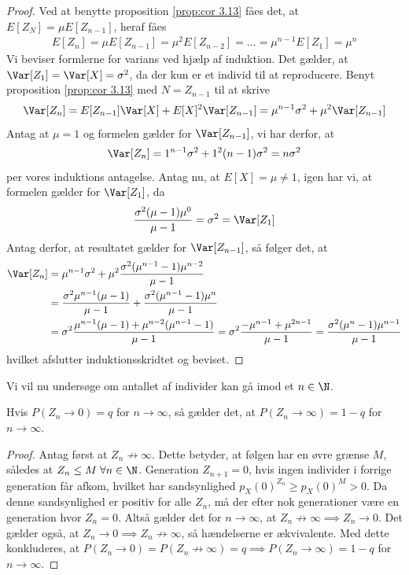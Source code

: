 \begin{proof}
Ved at benytte proposition \ref{prop:cor 3.13} fåes det, at $E[Z_N]=\mu E[Z_{n - 1}]$, heraf fåes
\begin{align*}
    E[Z_n]=\mu E[Z_{n - 1}]=\mu^2E[Z_{n-2}]= \dots = \mu^{n - 1} E[Z_1] = \mu^n
\end{align*}
Vi beviser formlerne for varians ved hjælp af induktion. 
Det gælder, at $\Var[Z_1] = \Var[X] = \sigma^2$, da der kun er et individ til at reproducere.
Benyt proposition \ref{prop:cor 3.13} med $N = Z_{n- 1}$ til at skrive
\begin{align*}
    \Var[Z_n] = E[Z_{n - 1}]\Var[X] + E[X]^2\Var[Z_{n - 1}]  = \mu^{n - 1}\sigma^2 + \mu^2\Var[Z_{n - 1}]
\end{align*}
Antag at $\mu = 1$ og formelen gælder for $\Var[Z_{n - 1}]$, vi har derfor, at 
\begin{equation*}
 \Var[Z_n] = 1^{n-1}\sigma^2 + 1^2 (n - 1)\sigma^2 = n \sigma^2   
\end{equation*}
per vores induktions antagelse.
Antag nu, at $E[X] = \mu \neq 1$, igen har vi, at formelen gælder for $\Var[Z_1]$, da 
\begin{equation*}
    \frac{\sigma^2(\mu - 1)\mu^0}{\mu - 1} = \sigma^2 = \Var[Z_1]
\end{equation*}
Antag derfor, at resultatet gælder for $\Var[Z_{n - 1}]$, så følger det, at
\begin{align*}
    \Var[Z_n] &= \mu^{n - 1} \sigma^2 + \mu^2 \frac{\sigma^2(\mu^{n  - 1} -1)\mu^{n-2}}{\mu-1} \\
    &= \frac{\sigma^2\mu^{n - 1}(\mu - 1)}{\mu - 1} + \frac{\sigma^2(\mu^{n - 1}-1)\mu^{n}}{\mu-1} \\
    &= \sigma^2\frac{\mu^{n - 1}(\mu - 1) + \mu^{n - 2}(\mu^{n - 1} - 1)}{\mu - 1}
    = \sigma^2 \frac{-\mu^{n - 1} + \mu^{2n - 1}}{\mu - 1} = \frac{\sigma^2(\mu^n - 1)\mu^{n - 1}}{\mu - 1}
\end{align*}
hvilket afslutter induktionsskridtet og beviset.
\end{proof}
Vi vil nu undersøge om antallet af individer kan gå imod et $n \in \N$.

\begin{prop} %
Hvis $P(Z_n \to 0) = q$ for $n \to \infty$, så gælder det, at  $P(Z_n \to \infty) = 1 - q$ for $n \to \infty$.
\end{prop}
\begin{proof}
Antag først at $Z_n\not\to\infty$.
Dette betyder, at følgen har en øvre grænse $M$, således at $Z_n \leq M \; \forall n\in \N$.
Generation $Z_{n+1}=0$, hvis ingen individer i forrige generation får afkom, hvilket har sandsynlighed $p_X(0)^{Z_n}\geq p_X(0)^{M}>0$.
Da denne sandsynlighed er positiv for alle $Z_n$, må der efter nok generationer være en generation hvor $Z_n=0$.
Altså gælder det for $n \to \infty$, at $Z_n\not\to\infty\implies Z_n\to0$.
Det gælder også, at $Z_n\to0\implies Z_n\not\to\infty$, så hændelserne er ækvivalente. Med dette konkluderes, at $P(Z_n \to 0) = P(Z_n\not\to\infty) = q \implies P(Z_n\to\infty) = 1-q$ for $n \to \infty$.
\end{proof}

